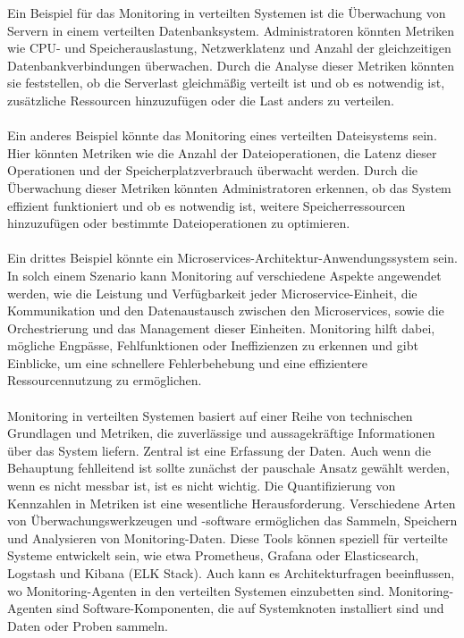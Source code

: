 Ein Beispiel für das Monitoring in verteilten Systemen ist die Überwachung von Servern in einem verteilten Datenbanksystem. Administratoren könnten Metriken wie CPU- und Speicherauslastung, Netzwerklatenz und Anzahl der gleichzeitigen Datenbankverbindungen überwachen. Durch die Analyse dieser Metriken könnten sie feststellen, ob die Serverlast gleichmäßig verteilt ist und ob es notwendig ist, zusätzliche Ressourcen hinzuzufügen oder die Last anders zu verteilen.
\\\\
Ein anderes Beispiel könnte das Monitoring eines verteilten Dateisystems sein. Hier könnten Metriken wie die Anzahl der Dateioperationen, die Latenz dieser Operationen und der Speicherplatzverbrauch überwacht werden. Durch die Überwachung dieser Metriken könnten Administratoren erkennen, ob das System effizient funktioniert und ob es notwendig ist, weitere Speicherressourcen hinzuzufügen oder bestimmte Dateioperationen zu optimieren.
\\\\
Ein drittes Beispiel könnte ein Microservices-Architektur-Anwendungssystem sein. In solch einem Szenario kann Monitoring auf verschiedene Aspekte angewendet werden, wie die Leistung und Verfügbarkeit jeder Microservice-Einheit, die Kommunikation und den Datenaustausch zwischen den Microservices, sowie die Orchestrierung und das Management dieser Einheiten. Monitoring hilft dabei, mögliche Engpässe, Fehlfunktionen oder Ineffizienzen zu erkennen und gibt Einblicke, um eine schnellere Fehlerbehebung und eine effizientere Ressourcennutzung zu ermöglichen.
\\\\
Monitoring in verteilten Systemen basiert auf einer Reihe von technischen Grundlagen und Metriken, die zuverlässige und aussagekräftige Informationen über das System liefern. Zentral ist eine Erfassung der Daten. Auch wenn die Behauptung fehlleitend ist sollte zunächst der pauschale Ansatz gewählt werden, wenn es nicht messbar ist, ist es nicht wichtig. Die Quantifizierung von Kennzahlen in Metriken ist eine wesentliche Herausforderung. Verschiedene Arten von Überwachungswerkzeugen und -software ermöglichen das Sammeln, Speichern und Analysieren von Monitoring-Daten. Diese Tools können speziell für verteilte Systeme entwickelt sein, wie etwa Prometheus, Grafana oder Elasticsearch, Logstash und Kibana (ELK Stack).
Auch kann es Architekturfragen beeinflussen, wo Monitoring-Agenten in den verteilten Systemen einzubetten sind. Monitoring-Agenten sind Software-Komponenten, die auf Systemknoten installiert sind und Daten  oder Proben sammeln. 
